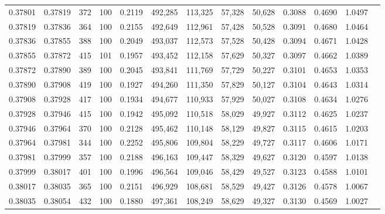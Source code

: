 \begin{tabular}{rrrrrrrrrrrrr}
0.37801 & 0.37819 &   372 & 100 &                                     0.2119 & 492,285 & 113,325 &  57,328 &  50,628 & 0.3088 & 0.4690 & 1.0497 \\
0.37819 & 0.37836 &   364 & 100 &                                     0.2155 & 492,649 & 112,961 &  57,428 &  50,528 & 0.3091 & 0.4680 & 1.0464 \\
0.37836 & 0.37855 &   388 & 100 &                                     0.2049 & 493,037 & 112,573 &  57,528 &  50,428 & 0.3094 & 0.4671 & 1.0428 \\
0.37855 & 0.37872 &   415 & 101 &                                     0.1957 & 493,452 & 112,158 &  57,629 &  50,327 & 0.3097 & 0.4662 & 1.0389 \\
0.37872 & 0.37890 &   389 & 100 &                                     0.2045 & 493,841 & 111,769 &  57,729 &  50,227 & 0.3101 & 0.4653 & 1.0353 \\
0.37890 & 0.37908 &   419 & 100 &                                     0.1927 & 494,260 & 111,350 &  57,829 &  50,127 & 0.3104 & 0.4643 & 1.0314 \\
0.37908 & 0.37928 &   417 & 100 &                                     0.1934 & 494,677 & 110,933 &  57,929 &  50,027 & 0.3108 & 0.4634 & 1.0276 \\
0.37928 & 0.37946 &   415 & 100 &                                     0.1942 & 495,092 & 110,518 &  58,029 &  49,927 & 0.3112 & 0.4625 & 1.0237 \\
0.37946 & 0.37964 &   370 & 100 &                                     0.2128 & 495,462 & 110,148 &  58,129 &  49,827 & 0.3115 & 0.4615 & 1.0203 \\
0.37964 & 0.37981 &   344 & 100 &                                     0.2252 & 495,806 & 109,804 &  58,229 &  49,727 & 0.3117 & 0.4606 & 1.0171 \\
0.37981 & 0.37999 &   357 & 100 &                                     0.2188 & 496,163 & 109,447 &  58,329 &  49,627 & 0.3120 & 0.4597 & 1.0138 \\
0.37999 & 0.38017 &   401 & 100 &                                     0.1996 & 496,564 & 109,046 &  58,429 &  49,527 & 0.3123 & 0.4588 & 1.0101 \\
0.38017 & 0.38035 &   365 & 100 &                                     0.2151 & 496,929 & 108,681 &  58,529 &  49,427 & 0.3126 & 0.4578 & 1.0067 \\
0.38035 & 0.38054 &   432 & 100 &                                     0.1880 & 497,361 & 108,249 &  58,629 &  49,327 & 0.3130 & 0.4569 & 1.0027 \\

\end{tabular}
